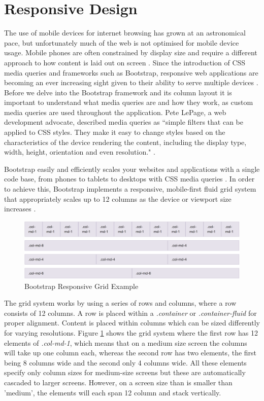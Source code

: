 \section{Responsive Design}
The use of mobile devices for internet browsing has grown at an astronomical pace, but unfortunately much of the web is not optimised for mobile device usage. Mobile phones are often constrained by display size and require a different approach to how content is laid out on screen \cite{GoogleDev:Responsiveness}. Since the introduction of CSS media queries and frameworks such as Bootstrap, responsive web applications are becoming an ever increasing sight given to their ability to serve multiple devices \cite{Bootstrap:Home}. Before we delve into the Bootstrap framework and its column layout it is important to understand what media queries are and how they work, as custom media queries are used throughout the application. Pete LePage, a web development advocate, described media queries as ``simple filters that can be applied to CSS styles. They make it easy to change styles based on the characteristics of the device rendering the content, including the display type, width, height, orientation and even resolution." \cite{GoogleDev:Responsiveness}.

Bootstrap easily and efficiently scales your websites and applications with a single code base, from phones to tablets to desktops with CSS media queries \cite{Bootstrap:Home}. In order to achieve this, Bootstrap implements a responsive, mobile-first fluid grid system that appropriately scales up to 12 columns as the device or viewport size increases \cite{Bootstrap:Grid}.

\begin{figure}[H]
\centering
\includegraphics[width=1.0\textwidth]{images/Implementation/BootstrapGrid}
\caption{Bootstrap Responsive Grid Example} 
\label{fig:BootstrapGrid}
\end{figure}

The grid system works by using a series of rows and columns, where a row consists of 12 columns. A row is placed within a \emph{.container} or \emph{.container-fluid} for proper alignment. Content is placed within columns which can be sized differently for varying resolutions. Figure \ref{fig:BootstrapGrid} shows the grid system where the first row has 12 elements of \emph{.col-md-1}, which means that on a medium size screen the columns will take up one column each, whereas the second row has two elements, the first being 8 columns wide and the second only 4 columns wide. All these elements specify only column sizes for medium-size screens but these are automatically cascaded to larger screens. However, on a screen size than is smaller than 'medium', the elements will each span 12 column and stack vertically. 

